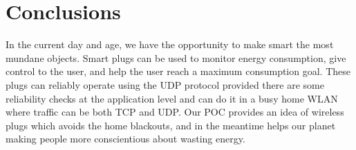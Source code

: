 \documentclass[conference]{IEEEtran}
\begin{document}
	\section{Conclusions}
	In the current day and age, we have the opportunity to make smart the most mundane objects. Smart plugs can be used to monitor energy consumption, give control to the user, and help the user reach a maximum consumption goal. These plugs can reliably operate using the UDP protocol provided there are some reliability checks at the application level and can do it in a busy home WLAN where traffic can be both TCP and UDP.
	Our POC provides an idea of wireless plugs which avoids the home blackouts, and in the meantime helps our planet making people more conscientious about wasting energy.
	{}
	
	
\end{document}
